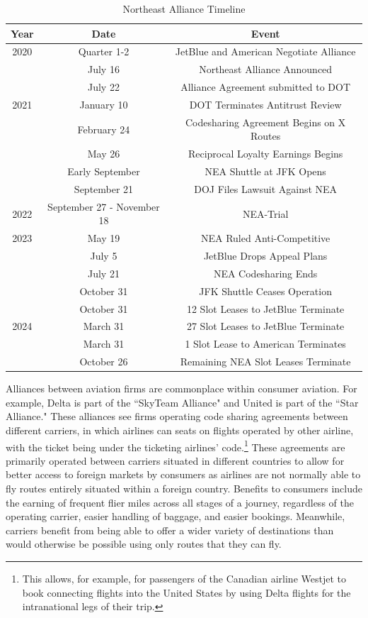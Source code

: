 \documentclass{article}
\begin{document}
    			\begin{table}[tb]
		\caption{Northeast Alliance Timeline}
		\label{tab:NEA_Timeline}
		\begin{center}
			\begin{tabular}{ccc}
				\hline
				Year & Date & Event \\
				\hline
				2020 & Quarter 1-2 & JetBlue and American Negotiate Alliance \\ 
				& July 16 & Northeast Alliance Announced \\
				& July 22 & Alliance Agreement submitted to DOT \\
				\hline 
				2021 & January 10 & DOT Terminates Antitrust Review \\
				& February 24 & Codesharing Agreement Begins on {X} Routes \\
				& May 26 & Reciprocal Loyalty Earnings Begins \\
				& Early September & NEA Shuttle at JFK Opens \\
				& September 21 & DOJ Files Lawsuit Against NEA \\  
				\hline
				2022 & September 27 - November 18 & NEA-Trial \\
				\hline 
				2023 & May 19 & NEA Ruled Anti-Competitive \\
				& July 5 & JetBlue Drops Appeal Plans \\
				& July 21 & NEA Codesharing Ends \\
				& October 31 & JFK Shuttle Ceases Operation\\
				& October 31 & 12 Slot Leases to JetBlue Terminate \\
				\hline 
				2024 &  March 31  & 27 Slot Leases to JetBlue Terminate \\ 
				& March 31 & 1 Slot Lease to American Terminates \\
				& October 26 & Remaining NEA Slot Leases Terminate				 \end{tabular}
		\end{center}
	\end{table}

	
	Alliances between aviation firms are commonplace within consumer aviation. For example, Delta is part of the ``SkyTeam Alliance" and United is part of the ``Star Alliance." These alliances see firms operating code sharing agreements between different carriers, in which airlines can seats on flights operated by other airline, with the ticket being under the ticketing airlines' code.\footnote{This allows, for example, for passengers of the Canadian airline Westjet to book connecting flights into the United States by using Delta flights for the intranational legs of their trip.}  These agreements are primarily operated between carriers situated in different countries to allow for better access to foreign markets by consumers as airlines are not normally able to fly routes entirely situated within a foreign country. Benefits to consumers include the earning of frequent flier miles across all stages of a journey, regardless of the operating carrier, easier handling of baggage, and easier bookings. Meanwhile, carriers benefit from being able to offer a wider variety of destinations than would otherwise be possible using only routes that they can fly.
	
\end{document}
